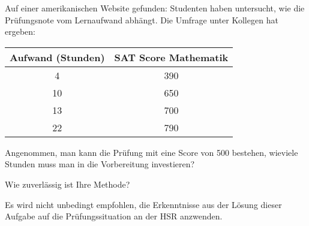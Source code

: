 Auf einer amerikanischen Website gefunden: Studenten haben untersucht,
wie die Prüfungsnote vom Lernaufwand abhängt.
Die Umfrage unter Kollegen hat ergeben:
\begin{center}
\begin{tabular}{c|c}
Aufwand (Stunden)&SAT Score Mathematik\\
\hline
4&390\\
10&650\\
13&700\\
22&790
\end{tabular}
\end{center}
\begin{teilaufgaben}
\item
Angenommen, man kann die Prüfung mit eine Score von 500 bestehen, 
wieviele Stunden muss man in die Vorbereitung investieren?
\item
Wie zuverlässig ist Ihre Methode?
\end{teilaufgaben}

\begin{hinweis}
Es wird nicht unbedingt empfohlen, die Erkenntnisse aus der
Lösung dieser Aufgabe auf die Prüfungssituation an der HSR anzwenden.
\end{hinweis}

